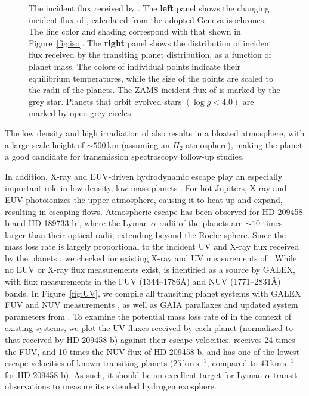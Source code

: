 \documentclass[apjl]{emulateapj}
\newcommand{\logg}{\ensuremath{\log{g}}}
\begin{document}
\begin{figure*}[!ht]
\caption{
The incident flux received by \hatcurb{}. The \textbf{left} panel shows the changing incident flux of \hatcurb{}, calculated from the adopted Geneva isochrones. The line color and shading correspond with that shown in Figure~\ref{fig:iso}. The \textbf{right} panel shows the distribution of incident flux received by the transiting planet distribution, as a function of planet mass. The colors of individual points indicate their equilibrium temperatures, while the size of the points are scaled to the radii of the planets. The ZAMS incident flux of \hatcurb{} is marked by the grey star. Planets that orbit evolved stars $(\logg < 4.0)$ are marked by open grey circles. 
\label{fig:flux}}
\end{figure*}

The low density and high irradiation of \hatcurb{} also results in a bloated atmosphere, with a large scale height of $\sim500$\,km (assuming an $H_2$ atmosphere), making the planet a good candidate for transmission spectroscopy follow-up studies.

In addition, X-ray and EUV-driven hydrodynamic escape play an especially important role in low density, low mass planets \citep[e.g.][]{2007A&A...461.1185L,2009ApJ...693...23M,2011A&A...529A.136E,2012MNRAS.425.2931O,2013ApJ...775..105O}. For hot-Jupiters, X-ray and EUV photoionizes the upper atmosphere, causing it to heat up and expand, resulting in escaping flows.  Atmospheric escape has been observed for HD 209458 b \citep{2003Natur.422..143V,2004ApJ...604L..69V} and HD 189733 b \citep{2010A&A...514A..72L}, where the Lyman-$\alpha$ radii of the planets are $\sim 10$ times larger than their optical radii, extending beyond the Roche sphere. Since the mass loss rate is largely proportional to the incident UV and X-ray flux received by the planets \citep[e.g.][]{2009ApJ...693...23M}, we checked for existing X-ray and UV measurements of \hatcur{}. While no EUV or X-ray flux measurements exist, \hatcur{} is identified as a source by GALEX, with flux measurements in the FUV (1344--1786\AA) and NUV (1771--2831\AA) bands. In Figure~\ref{fig:UV}, we compile all transiting planet systems with GALEX FUV and NUV measurements \citep{Bianchi:2011}, as well as GAIA parallaxes and updated system parameters from \citet{2016arXiv160904389S}. To examine the potential mass loss rate of \hatcurb{} in the context of existing systems, we plot the UV fluxes received by each planet (normalized to that received by HD 209458 b) against their escape velocities. \hatcurb{} receives 24 times the FUV, and 10 times the NUV flux of HD 209458 b, and has one of the lowest escape velocities of known transiting planets ($25\,\mathrm{km\,s}^{-1}$, compared to $43\,\mathrm{km\,s}^{-1}$ for HD 209458 b). As such, it should be an excellent target for Lyman-$\alpha$ transit observations to measure its extended hydrogen exosphere. 
\end{document}
